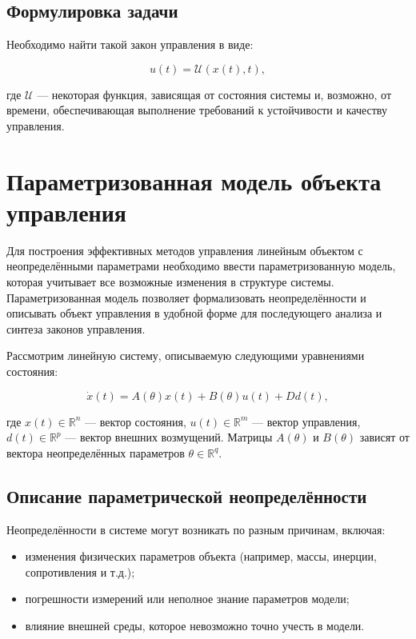 \documentclass[a4paper,14pt]{extarticle} %
\begin{document}
\subsection*{Формулировка задачи}

Необходимо найти такой закон управления в виде:

\begin{equation}
    u(t) = \mathcal{U}(x(t), t),
\end{equation}

где \( \mathcal{U} \) — некоторая функция, зависящая от состояния системы и, возможно, от времени, обеспечивающая выполнение требований к устойчивости и качеству управления.

\newpage
\section{Параметризованная модель объекта управления}

Для построения эффективных методов управления линейным объектом с неопределёнными параметрами необходимо ввести параметризованную модель, которая учитывает все возможные изменения в структуре системы. Параметризованная модель позволяет формализовать неопределённости и описывать объект управления в удобной форме для последующего анализа и синтеза законов управления.

Рассмотрим линейную систему, описываемую следующими уравнениями состояния:

\begin{equation}
    \dot{x}(t) = A(\theta)x(t) + B(\theta)u(t) + Dd(t),
\end{equation}

где \( x(t) \in \mathbb{R}^n \) — вектор состояния, \( u(t) \in \mathbb{R}^m \) — вектор управления, \( d(t) \in \mathbb{R}^p \) — вектор внешних возмущений. Матрицы \( A(\theta) \) и \( B(\theta) \) зависят от вектора неопределённых параметров \( \theta \in \mathbb{R}^q \).

\subsection*{Описание параметрической неопределённости}

Неопределённости в системе могут возникать по разным причинам, включая:

\begin{itemize}
    \item изменения физических параметров объекта (например, массы, инерции, сопротивления и т.д.);
    \item погрешности измерений или неполное знание параметров модели;
    \item влияние внешней среды, которое невозможно точно учесть в модели.
\end{itemize}
\end{document}

